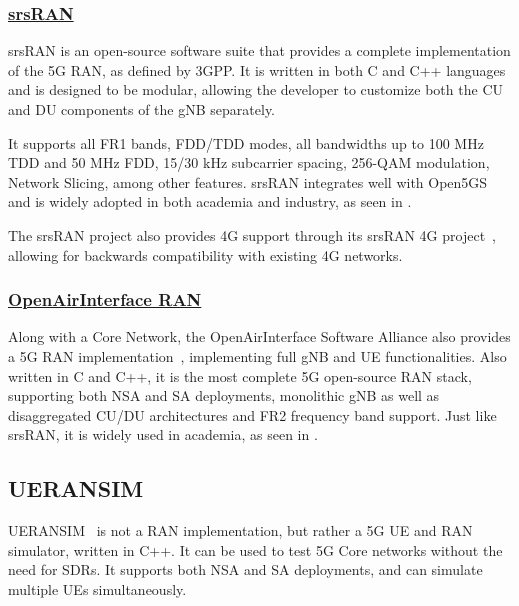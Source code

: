 \subsubsection*{\normalfont\uline{srsRAN}}
\label{sec:srsran}

srsRAN \cite{srsran_project} is an open-source software suite that provides a complete implementation of the 5G \gls{RAN}, as defined by \gls{3GPP}. It is written in both C and C++ languages and is designed to be modular, allowing the developer to customize both the \gls{CU} and \gls{DU} components of the \gls{gNB} separately. 

It supports all FR1 bands, FDD/TDD modes, all bandwidths up to 100 MHz TDD and 50 MHz FDD, 15/30 kHz subcarrier spacing, 256-QAM modulation, Network Slicing, among other features. srsRAN integrates well with Open5GS and is widely adopted in both academia and industry, as seen in \cites{horstmann2025open5gcube}{mamushiane2023deploying}{tio2025exploring5g}{vazquez2024maq5g}.

The srsRAN project also provides 4G  support through its srsRAN 4G project~\cite{srsran_4g_repo}, allowing for backwards compatibility with existing 4G networks.

\subsubsection*{\normalfont\uline{OpenAirInterface RAN}}
\label{sec:openairinterface_ran}

Along with a Core Network, the OpenAirInterface Software Alliance also provides a 5G RAN implementation~\cite{oai5g_repo}, implementing full \gls{gNB} and \gls{UE} functionalities. Also written in C and C++, it is the most complete 5G open-source RAN stack, supporting both \gls{NSA} and \gls{SA} deployments, monolithic \gls{gNB} as well as disaggregated \gls{CU}/\gls{DU} architectures and FR2 frequency band support. Just like srsRAN, it is widely used in academia, as seen in \cites{bonati2025_5gct}{horstmann2025open5gcube}.



\subsection*{UERANSIM}
\label{sec:ueransim}

UERANSIM~\cite{ueransim_repo} is not a \gls{RAN} implementation, but rather a 5G \gls{UE} and \gls{RAN} simulator, written in C++. It can be used to test 5G Core networks without the need for \glspl{SDR}. It supports both \gls{NSA} and \gls{SA} deployments, and can simulate multiple \glspl{UE} simultaneously. 

